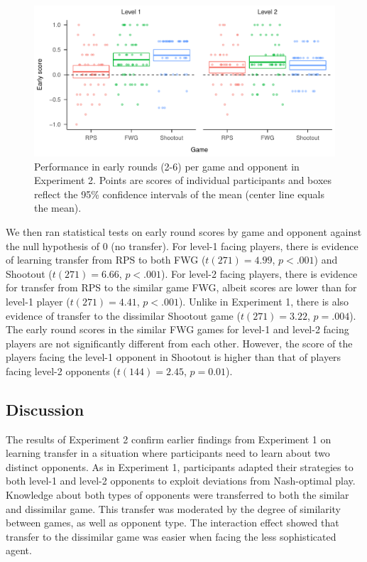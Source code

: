 \documentclass[smallextended]{svjour3}       %
\begin{document}
\begin{figure}

{\centering \includegraphics[width=\textwidth]{CBB_files/figure-latex/exp2-early-score-by-opp-1} 

}

\caption{\label{ref:figure4-caption}Performance in early rounds (2-6) per game and opponent in Experiment 2. Points are scores of individual participants and boxes reflect the 95\% confidence intervals of the mean (center line equals the mean).}\label{fig:exp2-early-score-by-opp}
\end{figure}

We then ran statistical tests on early round scores by game and opponent
against the null hypothesis of 0 (no transfer). For level-1 facing
players, there is evidence of learning transfer from RPS to both FWG
(\(t(271) = 4.99\), \(p < .001\)) and Shootout (\(t(271) = 6.66\),
\(p < .001\)). For level-2 facing players, there is evidence for
transfer from RPS to the similar game FWG, albeit scores are lower than
for level-1 player (\(t(271) = 4.41\), \(p < .001\)). Unlike in
Experiment 1, there is also evidence of transfer to the dissimilar
Shootout game (\(t(271) = 3.22\), \(p = .004\)). The early round scores
in the similar FWG games for level-1 and level-2 facing players are not
significantly different from each other. However, the score of the
players facing the level-1 opponent in Shootout is higher than that of
players facing level-2 opponents (\(t(144) = 2.45\), \(p = 0.01\)).

\hypertarget{discussion-1}{%
\subsection{Discussion}\label{discussion-1}}

The results of Experiment 2 confirm earlier findings from Experiment 1
on learning transfer in a situation where participants need to learn
about two distinct opponents. As in Experiment 1, participants adapted
their strategies to both level-1 and level-2 opponents to exploit
deviations from Nash-optimal play. Knowledge about both types of
opponents were transferred to both the similar and dissimilar game. This
transfer was moderated by the degree of similarity between games, as
well as opponent type. The interaction effect showed that transfer to
the dissimilar game was easier when facing the less sophisticated agent.
\end{document}
